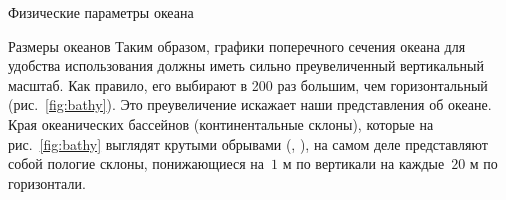 \begin{chapter}{Физические параметры океана}
\begin{section}{Размеры океанов}
Таким образом, графики поперечного сечения океана для
удобства использования должны иметь сильно преувеличенный вертикальный
масштаб. Как правило, его выбирают в 200 раз большим, 
чем горизонтальный (рис.~\ref{fig:bathy}). Это преувеличение искажает наши
представления об океане. Края океанических бассейнов (континентальные
склоны), которые на рис.~\ref{fig:bathy} выглядят крутыми обрывами 
(, ), на самом деле представляют собой 
пологие склоны, понижающиеся на~$1\mbox{~м}$ по вертикали 
на каждые~$20\mbox{~м}$ по горизонтали.
%


\end{section}
\end{chapter}
